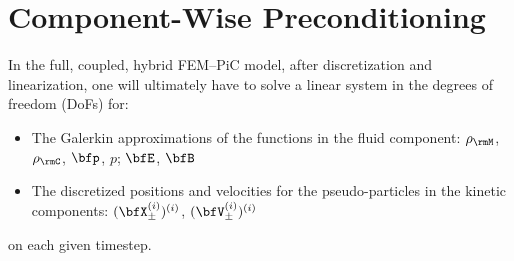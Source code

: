 \section{Component-Wise Preconditioning}
    In the full, coupled, hybrid FEM--PiC model, after discretization and linearization, one will ultimately have to solve a linear system in the degrees of freedom (DoFs) for:
    \begin{itemize}
        \item  The Galerkin approximations of the functions in the fluid component: $\rho_{\rmM}$, $\rho_{\rmC}$, $\bfp$, $p$; $\bfE$, $\bfB$
        \item  The discretized positions and velocities for the pseudo-particles in the kinetic components: $(\bfX_{\pm}^{(i)})^{(i)}$, $(\bfV_{\pm}^{(i)})^{(i)}$
    \end{itemize}
    on each given timestep.

